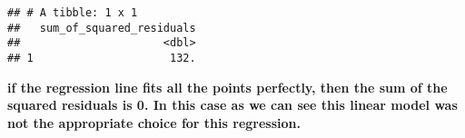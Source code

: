 \documentclass[
]{article}
\begin{document}
\begin{verbatim}
## # A tibble: 1 x 1
##   sum_of_squared_residuals
##                      <dbl>
## 1                     132.
\end{verbatim}

\textbf{if the regression line fits all the points perfectly, then the
sum of the squared residuals is 0. In this case as we can see this
linear model was not the appropriate choice for this regression.}
\end{document}
